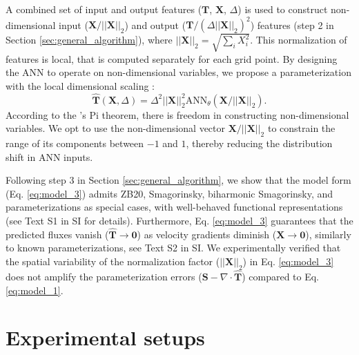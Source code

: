 \documentclass[draft]{agujournal2019}
\begin{document}
A combined set of input and output features ($\mathbf{T}$, $\mathbf{X}$, $\Delta$) is used to construct non-dimensional input ($\mathbf{X} / ||\mathbf{X}||_2$) and output ($\mathbf{T} / (\Delta ||\mathbf{X}||_2)^2$) features (step 2 in Section \ref{sec:general_algorithm}), where $||\mathbf{X}||_2= \sqrt{\sum_i X_i^2}$. This normalization of features is local, that is computed separately for each grid point. By designing the ANN to operate on non-dimensional variables, we propose a parameterization with the local dimensional scaling \cite{reissmann2021application, prakash2022invariant}:
\begin{equation}
    \widehat{\mathbf{T}}(\mathbf{X}, \Delta) = \Delta^2 ||\mathbf{X}||_2^2 \mathrm{ANN}_{\theta} (\mathbf{X} / ||\mathbf{X}||_2). \label{eq:model_3}
\end{equation}
According to the 's Pi theorem, there is freedom in constructing non-dimensional variables. We opt to use the non-dimensional vector $\mathbf{X} / ||\mathbf{X}||_2$ to constrain the range of its components between $-1$ and $1$, thereby reducing the distribution shift in ANN inputs. 

Following step 3 in Section \ref{sec:general_algorithm}, we show that the model form (Eq. \eqref{eq:model_3}) admits ZB20, Smagorinsky, biharmonic Smagorinsky, and  parameterizations as special cases, with well-behaved functional representations (see Text S1 in SI for details). Furthermore, Eq. \eqref{eq:model_3} guarantees that the predicted fluxes vanish ($\widehat{\mathbf{T}}\to\mathbf{0}$) as velocity gradients diminish ($\mathbf{X}\to\mathbf{0}$), similarly to known parameterizations, see Text S2 in SI. We experimentally verified that the spatial variability of the normalization factor ($||\mathbf{X}||_2$) in Eq. \eqref{eq:model_3} does not amplify the parameterization errors ($\mathbf{S}-\nabla \cdot \widehat{\mathbf{T}}$) compared to Eq. \eqref{eq:model_1}.



\section{Experimental setups}
\end{document}
